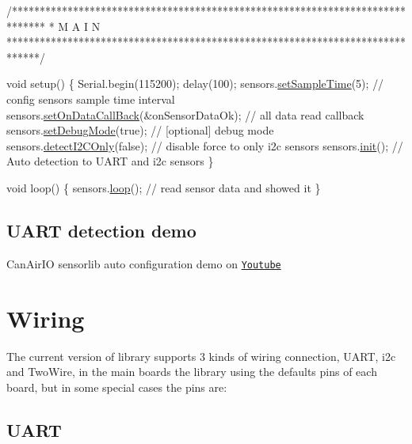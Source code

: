 \begin{DoxyCode}
\textcolor{comment}{/******************************************************************************}
\textcolor{comment}{*  M A I N}
\textcolor{comment}{******************************************************************************/}

\textcolor{keywordtype}{void} setup() \{
    Serial.begin(115200);
    delay(100);
    sensors.\hyperlink{classSensors_ac723c0d9cf5af5daa0fa8d041f41f3d8}{setSampleTime}(5);                       \textcolor{comment}{// config sensors sample time interval}
    sensors.\hyperlink{classSensors_a729f911e0508cc8814a2276ff519b219}{setOnDataCallBack}(&onSensorDataOk);     \textcolor{comment}{// all data read callback}
    sensors.\hyperlink{classSensors_ac749e2c2618a177afa7d72ce68573fa5}{setDebugMode}(\textcolor{keyword}{true});                     \textcolor{comment}{// [optional] debug mode}
    sensors.\hyperlink{classSensors_ae25465fbd64d3b2b9ae31e2cb5a4b246}{detectI2COnly}(\textcolor{keyword}{false});                   \textcolor{comment}{// disable force to only i2c sensors}
    sensors.\hyperlink{classSensors_a019efdf3e65081e9ace94e1f05338e4b}{init}();                                 \textcolor{comment}{// Auto detection to UART and i2c sensors}
\}

\textcolor{keywordtype}{void} loop() \{
    sensors.\hyperlink{classSensors_a255ece4e475221edb8ba7a8983014a76}{loop}();  \textcolor{comment}{// read sensor data and showed it}
\}
\end{DoxyCode}


\subsection*{U\+A\+RT detection demo}

\href{https://www.youtube.com/watch?v=hmukAmG5Eec}{\tt }

Can\+Air\+IO sensorlib auto configuration demo on \href{https://www.youtube.com/watch?v=hmukAmG5Eec}{\tt Youtube}

\section*{Wiring}

The current version of library supports 3 kinds of wiring connection, U\+A\+RT, i2c and Two\+Wire, in the main boards the library using the defaults pins of each board, but in some special cases the pins are\+:

\subsection*{U\+A\+RT}

